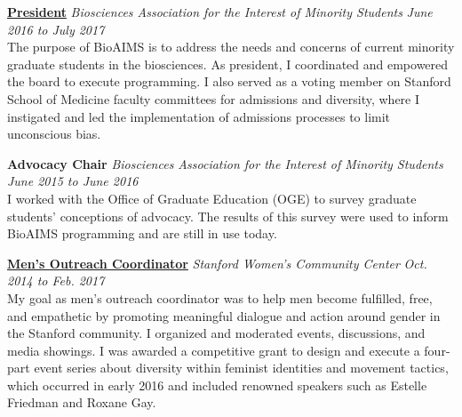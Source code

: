     \href{https://www.bioaims.com/}
    {\textbf{President}}
    \textsl{Biosciences Association for the Interest of Minority Students}
    \hfill \textsl{June 2016 to July 2017}  \\ 
    {\small The purpose of BioAIMS is to address the needs and concerns of current minority graduate students in the biosciences. As president, I coordinated and empowered the board to execute programming. I also served as a voting member on Stanford School of Medicine faculty committees for admissions and diversity, where I instigated and led the implementation of admissions processes to limit unconscious bias.}

    \textbf{Advocacy Chair} 
    \textsl{Biosciences Association for the Interest of Minority Students}
    \hfill \textsl{June 2015 to June 2016} \\ 
    {\small I worked with the Office of Graduate Education (OGE) to survey graduate students' conceptions of advocacy. The results of this survey were used to inform BioAIMS programming and are still in use today.}
    
    \href{https://stanfordmaleoutreach.weebly.com/}
    {\textbf{Men's Outreach Coordinator}}
    \textsl{Stanford Women's Community Center} 
    \hfill \textsl{Oct. 2014 to Feb. 2017} \\ 
    {\small My goal as men's outreach coordinator was to help men become fulfilled, free, and empathetic by promoting meaningful dialogue and action around gender in the Stanford community. I organized and moderated events, discussions, and media showings. I was awarded a competitive grant to design and execute a four-part event series about diversity within feminist identities and movement tactics, which occurred in early 2016 and included renowned speakers such as Estelle Friedman and Roxane Gay.}